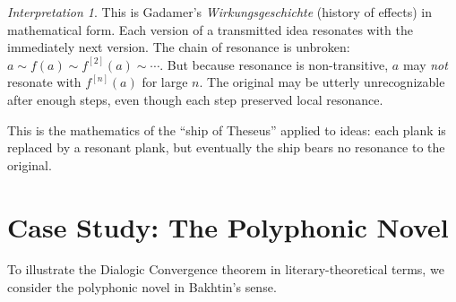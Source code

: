 \documentclass[11pt,openany]{book}
\theoremstyle{definition}
\theoremstyle{plain}
\theoremstyle{remark}
\newtheorem{interpretation}[axiom]{Interpretation}
\newcommand{\res}{\sim}                      %
\begin{document}
\begin{interpretation}
This is Gadamer's \emph{Wirkungsgeschichte} (history of effects) in mathematical form. Each version of a transmitted idea resonates with the immediately next version. The chain of resonance is unbroken: $a \res f(a) \res f^{[2]}(a) \res \cdots$. But because resonance is non-transitive, $a$ may \emph{not} resonate with $f^{[n]}(a)$ for large $n$. The original may be utterly unrecognizable after enough steps, even though each step preserved local resonance.

This is the mathematics of the ``ship of Theseus'' applied to ideas: each plank is replaced by a resonant plank, but eventually the ship bears no resonance to the original.
\end{interpretation}

\section{Case Study: The Polyphonic Novel}

To illustrate the Dialogic Convergence theorem in literary-theoretical terms, we consider the polyphonic novel in Bakhtin's sense.
\end{document}
